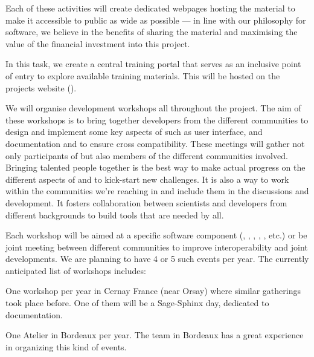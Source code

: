 \begin{workpackage}
\begin{tasklist}
\begin{task}[title=Training and training portal,
id=training-portal,lead=PS,PM=1,wphases={0-48!.1,0-1}]
Each of these activities will create dedicated webpages hosting the
material to make it accessible to public as wide as possible ---
in line with our philosophy for software, we believe in the benefits of
sharing the material and maximising the value of the financial
investment into this project.

In this task, we create a central \TheProject training portal that
serves as an inclusive point of entry to explore available training
materials. This will be hosted on the projects website ().
\end{task}

\begin{task}[title=Community Building: Development Workshops, lead=PS,PM=24, partners={UB,UK,SR,SA,USH}, id=devel-workshops, wphases=0-48]

  We will organise development workshops all throughout the
  project. The aim of these workshops is to bring together developers
  from the different communities to design and implement some key
  aspects of \TheProject such as user interface, and documentation and
  to ensure cross compatibility. These meetings will gather not only
  participants of \TheProject but also members of the different
  communities involved. Bringing talented people together is the best
  way to make actual progress on the different aspects of \TheProject
  and to kick-start new challenges. It is also a way to work within
  the communities we're reaching in and include them in the discussions
  and development. It fosters collaboration between scientists and
  developers from different backgrounds to build tools that are needed
  by all.

  Each workshop will be aimed at a specific software component (\Sage,
  \GAP, \SMC, \IPython, \Singular, etc.) or be joint meeting between
  different communities to improve interoperability and joint
  developments. We are planning to have 4 or 5 such events per
  year. The currently anticipated list of workshops includes:

\begin{compactitem}
\item One \Sage workshop per year in Cernay France (near Orsay) where
  similar gatherings took place before. One of them will be a
  Sage-Sphinx day, dedicated to documentation.

\item One Atelier \Pari in Bordeaux per year. The team in Bordeaux has
  a great experience in organizing this kind of \Pari events.


\end{compactitem}
\end{task}
\end{tasklist}
\end{workpackage}
